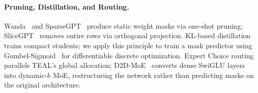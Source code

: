 \paragraph{Pruning, Distillation, and Routing.}
Wanda~\cite{sun2024wanda} and SparseGPT~\cite{frantar2023sparsegpt} produce static weight masks via one-shot pruning; SliceGPT~\cite{ashkboos2024slicegpt} removes entire rows via orthogonal projection.
KL-based distillation~\cite{kim2016sequencekd,sanh2019distilbert,gu2024minillm,agarwal2024gkd} trains compact students; we apply this principle to train a mask predictor using Gumbel-Sigmoid~\cite{maddison2017concrete,louizos2018l0} for differentiable discrete optimization.
Expert Choice routing~\cite{zhou2022expertchoice} parallels TEAL's global allocation; D2D-MoE~\cite{szatkowski2024d2dmoe} converts dense SwiGLU layers into dynamic-$k$ MoE, restructuring the network rather than predicting masks on the original architecture.

